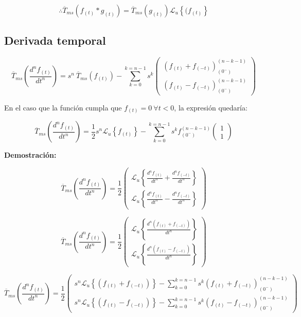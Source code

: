 \documentclass[12pt]{article}
\begin{document}
$$
\therefore \overline{T}_{ms}(f_{(t)} * g_{(t)}) =\overline{T}_{ms}( g_{(t)})  \mathcal{L}_u\left\{(f_{(t)} \right\}
$$


\subsection{Derivada temporal}

\begin{equation}\overline{T}_{ms}\left(\frac{d^n f_{(t)}}{dt^n}\right) =s^n\  \overline{T}_{ms}(f_{(t)})
- \sum\limits_{k=0}^{k=n-1} s^k
\begin{pmatrix}
 (f_{(t)} + f_{(-t)})^{(n-k-1)}_{(0^-)}\\[0.5 cm]
 (f_{(t)} - f_{(-t)})^{(n-k-1)}_{(0^-)}
\end{pmatrix}
\end{equation}

En el caso que la función cumpla que $f_{(t)} = 0 \ \forall t < 0$, la expresión quedaría:

$$\overline{T}_{ms}\left(\frac{d^n f_{(t)}}{dt^n}\right) = \frac12 s^n\mathcal{L}_u\left\{f_{(t)}\right\} -\sum\limits_{k=0}^{k=n-1} s^k f^{(n-k-1)}_{(0^-)}
\begin{pmatrix}
1\\
1
\end{pmatrix}
$$

{\bfseries Demostración:}

$$\overline{T}_{ms}\left(\frac{d^n f_{(t)}}{dt^n}\right) = \frac12
\begin{pmatrix}
\mathcal{L}_u\left\{\frac{d^n f_{(t)}}{dt^n} + \frac{d^n f_{(-t)}}{dt^n}\right\}\\[0.2 cm]
\mathcal{L}_u\left\{\frac{d^n f_{(t)}}{dt^n} - \frac{d^n f_{(-t)}}{dt^n}\right\}
\end{pmatrix}
$$

$$\overline{T}_{ms}\left(\frac{d^n f_{(t)}}{dt^n}\right) = \frac12
\begin{pmatrix}
\mathcal{L}_u\left\{\frac{d^n (f_{(t)} +f_{(-t)})}{dt^n}\right\}\\[0.2 cm]
\mathcal{L}_u\left\{\frac{d^n (f_{(t)}- f_{(-t)})}{dt^n}\right\}
\end{pmatrix}
$$

$$\overline{T}_{ms}\left(\frac{d^n f_{(t)}}{dt^n}\right) = \frac12
\begin{pmatrix}
s^n\mathcal{L}_u\left\{(f_{(t)} + f_{(-t)})\right\} -\sum\limits_{k=0}^{k=n-1} s^k (f_{(t)} + f_{(-t)})^{(n-k-1)}_{(0^-)}\\[0.5 cm]
s^n\mathcal{L}_u\left\{(f_{(t)} - f_{(-t)})\right\} -\sum\limits_{k=0}^{k=n-1} s^k (f_{(t)} - f_{(-t)})^{(n-k-1)}_{(0^-)}
\end{pmatrix}
$$
\end{document}
